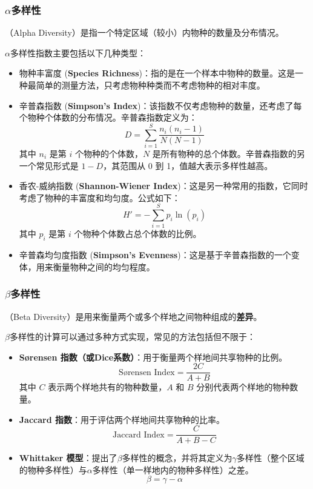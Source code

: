 \subsubsection{$\alpha$多样性}

（Alpha Diversity）是指一个特定区域（较小）内物种的数量及分布情况。

$\alpha$多样性指数主要包括以下几种类型：

\begin{itemize}
	\item 物种丰富度 (\textbf{Species Richness})：指的是在一个样本中物种的数量。这是一种最简单的测量方法，只考虑物种种类而不考虑物种的相对丰度。
	
	\item 辛普森指数 (\textbf{Simpson's Index})：该指数不仅考虑物种的数量，还考虑了每个物种个体数的分布情况。辛普森指数定义为：
	\[
	D = \sum_{i=1}^{S} \frac{n_i(n_i - 1)}{N(N-1)}
	\]
	其中 \( n_i \) 是第 \( i \) 个物种的个体数，\( N \) 是所有物种的总个体数。辛普森指数的另一个常见形式是 \( 1 - D \)，其范围从 0 到 1，值越大表示多样性越高。
	
	\item 香农-威纳指数 (\textbf{Shannon-Wiener Index})：这是另一种常用的指数，它同时考虑了物种的丰富度和均匀度。公式如下：
	\[
	H' = -\sum_{i=1}^{S} p_i \ln(p_i)
	\]
	其中 \( p_i \) 是第 \( i \) 个物种个体数占总个体数的比例。
	
	\item 辛普森均匀度指数 (\textbf{Simpson's Evenness})：这是基于辛普森指数的一个变体，用来衡量物种之间的均匀程度。
\end{itemize}

\subsubsection{$\beta$多样性}

（Beta Diversity）是用来衡量两个或多个样地之间物种组成的\textbf{差异}。

$\beta$多样性的计算可以通过多种方式实现，常见的方法包括但不限于：

\begin{itemize}
	\item \textbf{Sørensen 指数（或Dice系数）}：用于衡量两个样地间共享物种的比例。
	\[
	\textrm{Sørensen Index} = \frac{2C}{A + B}
	\]
	其中 \( C \) 表示两个样地共有的物种数量，\( A \) 和 \( B \) 分别代表两个样地的物种数量。
	
	\item \textbf{Jaccard 指数}：用于评估两个样地间共享物种的比率。
	\[
	\textrm{Jaccard Index} = \frac{C}{A + B - C}
	\]
	
	\item \textbf{Whittaker 模型}：提出了$\beta$多样性的概念，并将其定义为$\gamma$多样性（整个区域的物种多样性）与$\alpha$多样性（单一样地内的物种多样性）之差。
	\[
	\beta = \gamma - \alpha
	\]
\end{itemize}

